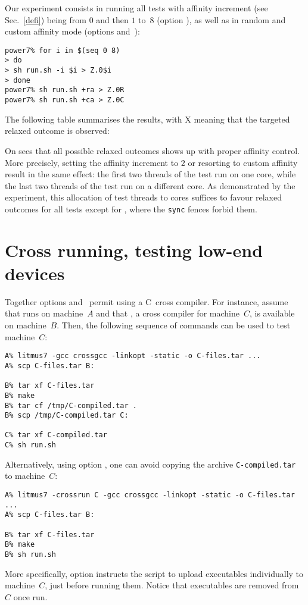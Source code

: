 Our experiment consists in running all tests
with affinity increment (see Sec.~\ref{defi}) being from $0$
and then $1$ to~$8$ (option ),
as well as in random and custom affinity mode
(options  and~):
\begin{verbatim}
power7% for i in $(seq 0 8)
> do
> sh run.sh -i $i > Z.0$i
> done
power7% sh run.sh +ra > Z.0R
power7% sh run.sh +ca > Z.0C

\end{verbatim}
The following table summarises the results, with X meaning that the targeted
relaxed outcome is observed:
\begin{center}\def\tstdir{tst-ppc}\let\handletest\xhandletest

\end{center}
On sees that all possible relaxed outcomes shows up with proper affinity
control. More precisely, setting the affinity increment to $2$ or resorting
to custom affinity result in the same effect:
the first two threads of the test run on one core, while the last two threads
of the test run on a different core.
As demonstrated by the experiment, this allocation of test threads to cores
suffices to favour relaxed outcomes for all tests except for
,
where the \texttt{sync} fences forbid them.


\section{Cross running, testing low-end devices}
Together \litmus{} options 
and~ permit using
a C~cross compiler. For instance, assume that \litmus{}
runs on machine~$A$ and that , a cross compiler for machine~$C$,
is available on machine~$B$. Then, the following sequence of
commands can be used to test machine~$C$:
\begin{verbatim}
A% litmus7 -gcc crossgcc -linkopt -static -o C-files.tar ...
A% scp C-files.tar B:

B% tar xf C-files.tar
B% make
B% tar cf /tmp/C-compiled.tar .
B% scp /tmp/C-compiled.tar C:

C% tar xf C-compiled.tar
C% sh run.sh
\end{verbatim}
Alternatively, using option ,
one can avoid copying the archive \verb+C-compiled.tar+ to machine~$C$:
\begin{verbatim}
A% litmus7 -crossrun C -gcc crossgcc -linkopt -static -o C-files.tar ...
A% scp C-files.tar B:

B% tar xf C-files.tar
B% make
B% sh run.sh
\end{verbatim}
More specifically, option  instructs the 
script to upload executables individually to machine~$C$, just before running
them. Notice that executables are removed from~$C$ once run.

